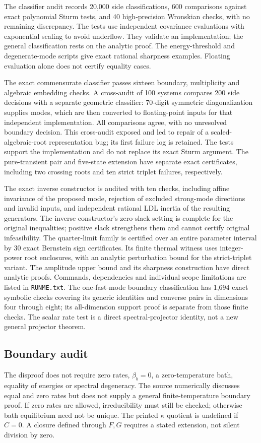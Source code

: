 \documentclass[11pt]{article}
\begin{document}
The classifier audit records 20,000 side classifications, 600 comparisons against
exact polynomial Sturm tests, and 40 high-precision Wronskian checks, with no remaining
discrepancy. The tests use independent covariance evaluations with exponential scaling
to avoid underflow. They validate an implementation; the general classification rests
on the analytic proof. The energy-threshold and degenerate-mode scripts give exact
rational sharpness examples. Floating evaluation alone does not certify equality cases.

The exact commensurate classifier passes sixteen boundary, multiplicity and algebraic
embedding checks. A cross-audit of 100 systems compares 200 side decisions with a
separate geometric classifier: 70-digit symmetric diagonalization supplies modes,
which are then converted to floating-point inputs for that independent implementation.
All comparisons agree, with no unresolved boundary decision. This cross-audit exposed
and led to repair of a scaled-algebraic-root representation bug; its first failure log
is retained. The tests support the implementation and do not replace its exact Sturm
argument. The pure-transient pair and five-state extension have separate exact
certificates, including two crossing roots and ten strict triplet failures, respectively.

The exact inverse constructor is audited with ten checks, including affine invariance
of the proposed mode, rejection of excluded strong-mode directions and invalid inputs,
and independent rational LDL inertia of the resulting generators. The inverse
constructor's zero-slack setting is complete for the original inequalities; positive
slack strengthens them and cannot certify original infeasibility. The quarter-limit
family is certified over an entire parameter interval by 30 exact Bernstein sign
certificates. Its finite thermal witness uses integer-power root enclosures, with an
analytic perturbation bound for the strict-triplet variant. The amplitude upper bound
and its sharpness construction have direct analytic proofs. Commands, dependencies and
individual scope limitations are listed in \texttt{RUNME.txt}. The one-fast-mode boundary classification has 1,694 exact symbolic checks covering its generic identities and converse pairs in dimensions four through eight; its all-dimension support proof is separate from those finite checks. The scalar rate test is a direct spectral-projector identity, not a new general projector theorem.

\subsection{Boundary audit}
The disproof does not require zero rates, $\beta_b=0$, a zero-temperature bath, equality of energies or spectral degeneracy. The source numerically discusses equal and zero rates but does not supply a general finite-temperature boundary proof. If zero rates are allowed, irreducibility must still be checked; otherwise bath equilibrium need not be unique. The printed $\kappa$ quotient is undefined if $C=0$. A closure defined through $F,G$ requires a stated extension, not silent division by zero.
\end{document}
